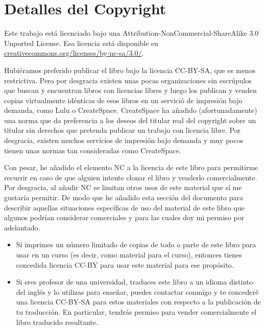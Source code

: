 
\chapter{Detalles del Copyright}

Este trabajo está licenciado bajo una
Attribution-NonCommercial-ShareAlike 3.0 Unported License.
Esa licencia está
disponible en
\url{creativecommons.org/licenses/by-nc-sa/3.0/}.  

Hubiéramos preferido publicar el libro bajo la licencia
CC-BY-SA, que es menos restrictiva. Pero por desgracia existen
unas pocas organizaciones sin escrúpulos
que buscan y encuentran libros con licencias libres
y luego los publican y venden copias virtualmente idénticas de esos libros
en un servició de impresión bajo demanda, como Lulu o CreateSpace. CreateSpace
ha añadido (afortunadamente) una norma que da preferencia a los deseos del titular
real del copyright sobre un titular sin derechos que pretenda
publicar un trabajo con licencia libre. Por desgracia, existen muchos
servicios de impresión bajo demanda y muy pocos tienen unas normas tan
consideradas como CreateSpace.

Con pesar, he añadido el elemento NC a la licencia
de este libro para permitirme recurrir en caso de que alguien intente clonar el
libro y venderlo comercialmente. Por desgracia, al añadir NC se limitan otros
usos de este material que sí me gustaría permitir. De modo que he añadido esta
sección del documento para describir aquellas situaciones específicas
de uso del material de este libro que algunos podrían considerar comerciales
y para las cuales doy mi permiso por adelantado.

\begin{itemize}
\item Si imprimes un número limitado de copias de todo o parte de
este libro para usar en un curso (es decir, como material para el curso),
entonces tienes concedida licencia CC-BY para usar este material para ese propósito.

\item Si eres profesor de una universidad, traduces este libro
a un idioma distinto del inglés y lo utilizas para enseñar, puedes
contactar conmigo y te concederé una licencia CC-BY-SA
para estos materiales con respecto a la publicación de tu traducción.
En particular, tendrás permiso para
vender comercialmente el libro traducido resultante.
\end{itemize}

